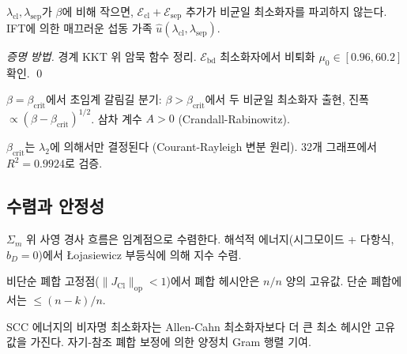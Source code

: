 \begin{theorem}
\label{thm:T8-Full}
$\lambda_{\mathrm{cl}}, \lambda_{\mathrm{sep}}$가 $\beta$에 비해 작으면, $\mathcal{E}_{\mathrm{cl}} + \mathcal{E}_{\mathrm{sep}}$ 추가가 비균일 최소화자를 파괴하지 않는다. IFT에 의한 매끄러운 섭동 가족 $\hat{u}(\lambda_{\mathrm{cl}}, \lambda_{\mathrm{sep}})$.
\end{theorem}
\begin{proof}[증명 방법]
경계 KKT 위 암묵 함수 정리. $\mathcal{E}_{\mathrm{bd}}$ 최소화자에서 비퇴화 $\mu_0 \in [0.96, 60.2]$ 확인. \qed
\end{proof}

\begin{theorem}
\label{thm:T-Birth}
$\beta = \beta_{\mathrm{crit}}$에서 초임계 갈림길 분기: $\beta > \beta_{\mathrm{crit}}$에서 두 비균일 최소화자 출현, 진폭 $\propto (\beta - \beta_{\mathrm{crit}})^{1/2}$. 삼차 계수 $A > 0$ (Crandall-Rabinowitz).
\end{theorem}

\begin{theorem}
\label{thm:FORMATION-BIRTH}
$\beta_{\mathrm{crit}}$는 $\lambda_2$에 의해서만 결정된다 (Courant-Rayleigh 변분 원리). 32개 그래프에서 $R^2 = 0.9924$로 검증.
\end{theorem}

\subsection{수렴과 안정성}

\begin{theorem}[T14. 경사 흐름 수렴]
\label{thm:T14}
$\Sigma_m$ 위 사영 경사 흐름은 임계점으로 수렴한다. 해석적 에너지(시그모이드 + 다항식, $b_D = 0$)에서 \L{}ojasiewicz 부등식에 의해 지수 수렴.
\end{theorem}

\begin{theorem}
\label{thm:T3T6}
비단순 폐합 고정점($\|J_{\mathrm{Cl}}\|_{\mathrm{op}} < 1$)에서 폐합 헤시안은 $n/n$ 양의 고유값. 단순 폐합에서는 $\leq (n-k)/n$.
\end{theorem}

\begin{theorem}
\label{thm:T7}
SCC 에너지의 비자명 최소화자는 Allen-Cahn 최소화자보다 더 큰 최소 헤시안 고유값을 가진다. 자기-참조 폐합 보정에 의한 양정치 Gram 행렬 기여.
\end{theorem}

